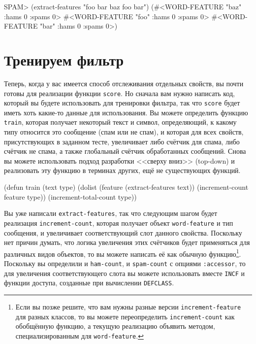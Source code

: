 \begin{myverb}
  SPAM> (extract-features "foo bar baz foo bar")
  (#<WORD-FEATURE "baz" :hams 0 :spams 0>
   #<WORD-FEATURE "foo" :hams 0 :spams 0>
   #<WORD-FEATURE "bar" :hams 0 :spams 0>)
\end{myverb}

\section{Тренируем фильтр}

Теперь, когда у вас имеется способ отслеживания отдельных свойств, вы почти готовы для
реализации функции \lstinline{score}.  Но сначала вам нужно написать код, который вы будете
использовать для тренировки фильтра, так что \lstinline{score} будет иметь хоть какие-то данные
для использования.  Вы можете определить функцию \lstinline{train}, которая получает некоторый
текст и символ, определяющий, к какому типу относится это сообщение (спам или не спам), и
которая для всех свойств, присутствующих в заданном тесте, увеличивает либо счётчик для
спама, либо счётчик не спама, а также глобальный счётчик обработанных сообщений.  Снова
вы можете использовать подход разработки <<сверху вниз>> (top-down) и реализовать эту
функцию в терминах других, ещё не существующих функций.

\begin{myverb}
(defun train (text type)
  (dolist (feature (extract-features text))
    (increment-count feature type))
  (increment-total-count type))
\end{myverb}

Вы уже написали \lstinline{extract-features}, так что следующим шагом будет реализация
\lstinline{increment-count}, которая получает объект \lstinline{word-feature} и тип сообщения, и
увеличивает соответствующий слот данного свойства.  Поскольку нет причин думать, что
логика увеличения этих счётчиков будет применяться для различных видов объектов, то вы
можете написать её как обычную функцию\footnote{Если вы позже решите, что вам нужны
  разные версии \lstinline{increment-feature} для разных классов, то вы можете переопределить
  \lstinline{increment-count} как обобщённую функцию, а текущую реализацию объявить методом,
  специализированным для \lstinline{word-feature}.}\hspace{\footnotenegspace}.  Поскольку вы определили и \lstinline{ham-count},
и \lstinline{spam-count} с опциями \lstinline{:accessor}, то для увеличения соответствующего слота
вы можете использовать вместе \lstinline{INCF} и функции доступа, созданные при вычислении
\lstinline{DEFCLASS}.

